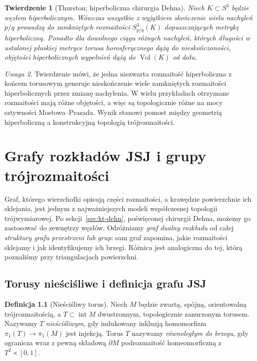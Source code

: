 \documentclass[11pt,a4paper]{report}
\numberwithin{equation}{section}
\theoremstyle{plain}
\newtheorem{twierdzenie}{Twierdzenie}[section]
\theoremstyle{definition}
\newtheorem{definicja}[twierdzenie]{Definicja}
\theoremstyle{remark}
\newtheorem{uwaga}[twierdzenie]{Uwaga}
\begin{document}
\begin{twierdzenie}[Thurston; hiperboliczna chirurgia Dehna]
Niech $K\subset S^3$ będzie węzłem hiperbolicznym.
Wówczas wszystkie z wyjątkiem skończenie wielu nachyleń
$p/q$ prowadzą do zamkniętych rozmaitości
$S^3_{p/q}(K)$ dopuszczających metrykę hiperboliczną.
Ponadto dla dowolnego ciągu różnych nachyleń, których
długości w ustalonej płaskiej metryce torusa horosferycznego
dążą do nieskończoności, objętości hiperbolicznych wypełnień
dążą do $\operatorname{Vol}(K)$ od dołu.
\end{twierdzenie}

\begin{uwaga}
Twierdzenie mówi, że jedna niezwarta rozmaitość hiperboliczna
z końcem torusowym generuje nieskończenie wiele zamkniętych
rozmaitości hiperbolicznych przez zmianę nachylenia.
W wielu przykładach otrzymane rozmaitości mają różne
objętości, a więc są topologicznie różne na mocy sztywności
Mostowa--Prasada. Wynik stanowi pomost między geometrią
hiperboliczną a konstrukcyjną topologią trójrozmaitości.
\end{uwaga}



\chapter{Grafy rozkładów JSJ i grupy trójrozmaitości}
\label{ch:tg-jsj-graphs}

Graf, którego wierzchołki opisują części rozmaitości,
a krawędzie powierzchnie ich sklejania, jest jednym z
najważniejszych modeli współczesnej topologii
trójwymiarowej. Po sekcji~\ref{sec:kt-dehn}, poświęconej
chirurgii Dehna, możemy go zastosować do zewnętrzy węzłów.
Odróżniamy \emph{graf dualny rozkładu}
od całej \emph{struktury grafu przestrzeni lub grup}:
sam graf zapomina, jakie rozmaitości sklejamy i jak
identyfikujemy ich brzegi. Różnica jest analogiczna
do tej, którą poznaliśmy przy triangulacjach powierzchni.

\section{Torusy nieściśliwe i definicja grafu JSJ}
\label{sec:tg-jsj-graph-def}

\begin{definicja}[Nieściśliwy torus]
Niech $M$ będzie zwartą, spójną, orientowalną
trójrozmaitością, a $T\subset\operatorname{int}M$
dwustronnym, topologicznie zanurzonym torusem.  Nazywamy $T$ \emph{nieściśliwym},
gdy indukowany inkluzją homomorfizm
$\pi_1(T)\to\pi_1(M)$ jest injekcją.
Torus $T$ nazywamy \emph{równoległym do brzegu},
gdy ogranicza wraz z pewną składową $\partial M$
podrozmaitość homeomorficzną z $T^2\times[0,1]$.
\end{definicja}
\end{document}
